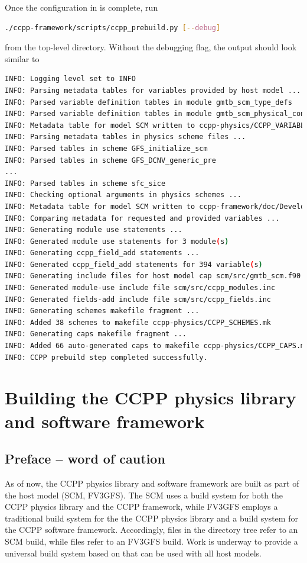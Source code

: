 Once the configuration in  is complete, run
\begin{lstlisting}[language=bash]
./ccpp-framework/scripts/ccpp_prebuild.py [--debug]
\end{lstlisting}
from the top-level directory. Without the debugging flag, the output should look similar to
\begin{lstlisting}[language=bash,basicstyle=\scriptsize\ttfamily]
INFO: Logging level set to INFO
INFO: Parsing metadata tables for variables provided by host model ...
INFO: Parsed variable definition tables in module gmtb_scm_type_defs
INFO: Parsed variable definition tables in module gmtb_scm_physical_constants
INFO: Metadata table for model SCM written to ccpp-physics/CCPP_VARIABLES.html
INFO: Parsing metadata tables in physics scheme files ...
INFO: Parsed tables in scheme GFS_initialize_scm
INFO: Parsed tables in scheme GFS_DCNV_generic_pre
...
INFO: Parsed tables in scheme sfc_sice
INFO: Checking optional arguments in physics schemes ...
INFO: Metadata table for model SCM written to ccpp-framework/doc/DevelopersGuide/CCPP_VARIABLES.tex
INFO: Comparing metadata for requested and provided variables ...
INFO: Generating module use statements ...
INFO: Generated module use statements for 3 module(s)
INFO: Generating ccpp_field_add statements ...
INFO: Generated ccpp_field_add statements for 394 variable(s)
INFO: Generating include files for host model cap scm/src/gmtb_scm.f90 ...
INFO: Generated module-use include file scm/src/ccpp_modules.inc
INFO: Generated fields-add include file scm/src/ccpp_fields.inc
INFO: Generating schemes makefile fragment ...
INFO: Added 38 schemes to makefile ccpp-physics/CCPP_SCHEMES.mk
INFO: Generating caps makefile fragment ...
INFO: Added 66 auto-generated caps to makefile ccpp-physics/CCPP_CAPS.mk
INFO: CCPP prebuild step completed successfully.
\end{lstlisting}

\section{Building the CCPP physics library and software framework}
\label{sec_ccpp_build}
\subsection{Preface -- word of caution}
As of now, the CCPP physics library and software framework are built as part of the host model (SCM, FV3GFS). The SCM uses a  build system for both the CCPP physics library and the CCPP framework, while FV3GFS employs a traditional  build system for the the CCPP physics library and a  build system for the CCPP software framework. Accordingly,  files in the  directory tree refer to an SCM build, while  files refer to an FV3GFS build. Work is underway to provide a universal build system based on  that can be used with all host models.

